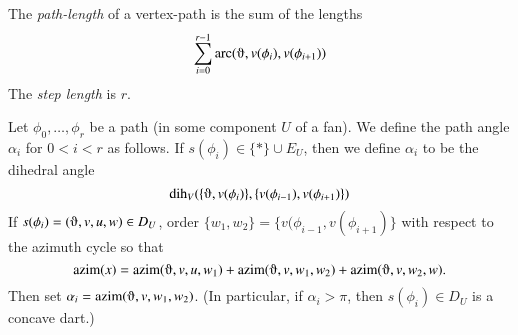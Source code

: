 \begin{definition}
The {\it path-length} of a vertex-path is the sum of the lengths
$$
\sum_{i=0}^{r-1}\arc(\orgn,v(\phi_i),v(\phi_{i+1}))
$$
The {\it step length} is $r$.
\end{definition}



\begin{definition}  Let $\phi_0,\ldots,\phi_r$ be a path (in
some component $U$ of a fan).  We define the path angle $\alpha_i$
for $0 < i < r$ as follows.  If $s(\phi_i)\in \{*\}\cup E_U$, then
we define $\alpha_i$ to be the dihedral angle 
   $$\dih_V(\{\orgn,v(\phi_i)\},\{v(\phi_{i-1}),v(\phi_{i+1})\})$$
If $s(\phi_i)=(\orgn,v,u,w)\in D_U$, order $\{w_1,w_2\} = \{v(\phi_{i-1},v(\phi_{i+1})\}$ with respect to the azimuth cycle so that
  $$\op{azim}(x) = \op{azim}(\orgn,v,u,w_1)+\op{azim}(\orgn,v,w_1,w_2)+
    \op{azim}(\orgn,v,w_2,w).$$
Then set $\alpha_i = \op{azim}(\orgn,v,w_1,w_2)$.  (In particular,
if $\alpha_i >\pi$, then $s(\phi_i)\in D_U$ is a concave dart.)
\end{definition}

